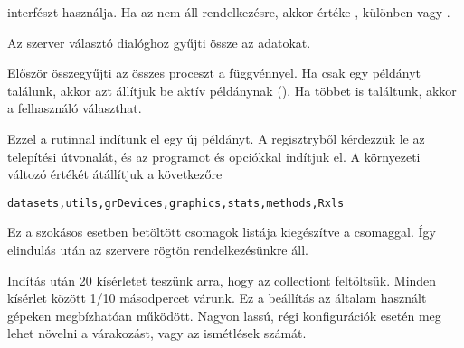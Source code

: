 \begin{description}
  interfészt használja. Ha az nem áll rendelkezésre,  akkor értéke
  , különben  vagy .
\item[\code{Rprocdata}] Az  szerver választó
  dialóghoz gyűjti össze az adatokat.
\item[\code{RprocInit}] Először
  összegyűjti az összes  proceszt a  függvénnyel. Ha csak
  egy  példányt találunk, akkor azt állítjuk be aktív 
  példánynak (). Ha többet is találtunk, akkor a felhasználó
  választhat. 
\item[\code{Rstart}] Ezzel a rutinnal indítunk el egy új 
  példányt. A regisztryből kérdezzük le az  telepítési útvonalát,
  és az  programot  és 
  opciókkal indítjuk el. A 
   környezeti változó értékét átállítjuk a
  következőre  
\begin{verbatim}
datasets,utils,grDevices,graphics,stats,methods,Rxls
\end{verbatim}
  Ez a
  szokásos esetben betöltött csomagok listája kiegészítve a 
  csomaggal. Így elindulás után az   szervere rögtön
  rendelkezésünkre áll.  

  Indítás után 20 kísérletet teszünk arra, hogy
  az  collectiont feltöltsük. Minden kísérlet között 1/10
  másodpercet várunk. Ez a beállítás az általam használt gépeken
  megbízhatóan működött. Nagyon lassú, régi konfigurációk esetén meg
  lehet növelni a várakozást, vagy az ismétlések számát.  


\end{description}
